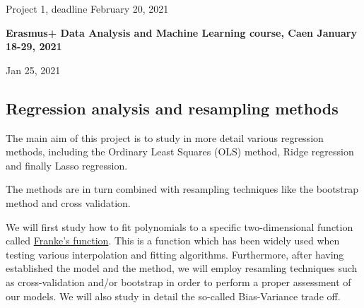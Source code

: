 \documentclass[%
oneside,                 %
final,                   %
10pt]{article}
\begin{document}

\newcommand{\exercisesection}[1]{\subsection*{#1}}






\thispagestyle{empty}

\begin{center}
{\LARGE\bf
\begin{spacing}{1.25}
Project 1, deadline February 20, 2021
\end{spacing}
}
\end{center}


\begin{center}
{\bf Erasmus+ Data Analysis and Machine Learning course, Caen January 18-29, 2021${}^{}$} \\ [0mm]
\end{center}

\begin{center}
\end{center}
    

\begin{center}
Jan 25, 2021
\end{center}

\vspace{1cm}


\subsection{Regression analysis and resampling methods}

The main aim of this project is to study in more detail various
regression methods, including the Ordinary Least Squares (OLS) method,
Ridge regression and finally Lasso regression. 

The methods are in turn combined with resampling techniques like the bootstrap method and cross validation. 

We will first study how to fit polynomials to a specific
two-dimensional function called \href{{http://www.dtic.mil/dtic/tr/fulltext/u2/a081688.pdf}}{Franke's
function}.  This
is a function which has been widely used when testing various
interpolation and fitting algorithms. Furthermore, after having
established the model and the method, we will employ resamling
techniques such as cross-validation and/or bootstrap in order to perform a
proper assessment of our models. We will also study in detail the
so-called Bias-Variance trade off.
\end{document}
